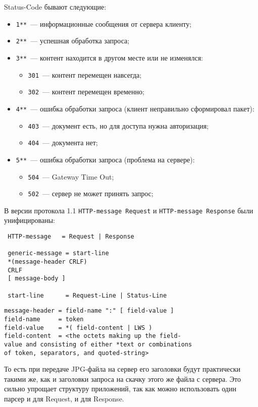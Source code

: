 Status-Code бывают следующие:
\begin{itemize}
\item \verb|1**|~--- информационные сообщения от сервера клиенту;
\item \verb|2**|~--- успешная обработка запроса;
\item \verb|3**|~--- контент находится в другом месте или не изменялся:
    \begin{itemize}
    \item \verb|301|~--- контент перемещен навсегда;
    \item \verb|302|~--- контент перемещен временно;
    \end{itemize}
\item \verb|4**|~--- ошибка обработки запроса (клиент неправильно сформировал пакет):
    \begin{itemize}
    \item \verb|403|~--- документ есть, но для доступа нужна авторизация;
    \item \verb|404|~--- документа нет;
    \end{itemize}
\item \verb|5**|~--- ошибка обработки запроса (проблема на сервере):
    \begin{itemize}
    \item \verb|504|~--- Gateway Time Out;
    \item \verb|502|~--- сервер не может принять запрос;
    \end{itemize}
\end{itemize}
В версии протокола 1.1 \verb|HTTP-message Request| и \verb|HTTP-message Response| были унифицированы:
\begin{verbatim}
 HTTP-message   = Request | Response

 generic-message = start-line
 *(message-header CRLF)
 CRLF
 [ message-body ]

 start-line      = Request-Line | Status-Line
\end{verbatim}

\begin{verbatim}
message-header = field-name ":" [ field-value ]
field-name     = token
field-value    = *( field-content | LWS )
field-content  = <the octets making up the field-
value and consisting of either *text or combinations
of token, separators, and quoted-string>
\end{verbatim}
То есть при передаче JPG-файла на сервер его заголовки будут практически такими же, как и заголовки запроса на скачку этого же файла с сервера. Это сильно упрощает структуру приложений, так как можно использовать один парсер и для Request, и для Response.


